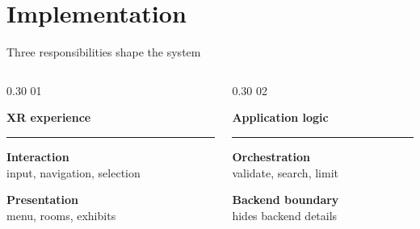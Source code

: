 \section{Implementation}
\begin{frame}[c]{Three responsibilities shape the system}
\begin{columns}[T,onlytextwidth]
  \begin{column}{0.30\textwidth}
    \textcolor{unired}{\LARGE 01}

    \vspace{0.08cm}
    \large\textbf{XR experience}

    \vspace{0.12cm}
    \color{unimint}\rule{\linewidth}{1.6pt}
    \color{black}

    \raggedright

    \vspace{0.18cm}
    \footnotesize
    \textbf{Interaction}\\
    input, navigation, selection

    \vspace{0.20cm}
    \textbf{Presentation}\\
    menu, rooms, exhibits
  \end{column}

  \begin{column}{0.30\textwidth}
    \textcolor{unired}{\LARGE 02}

    \vspace{0.08cm}
    \large\textbf{Application logic}

    \vspace{0.12cm}
    \color{unimint}\rule{\linewidth}{1.6pt}
    \color{black}

    \raggedright

    \vspace{0.18cm}
    \footnotesize
    \textbf{Orchestration}\\
    validate, search, limit

    \vspace{0.20cm}
    \textbf{Backend boundary}\\
    hides backend details
  \end{column}


\end{columns}
\end{frame}
